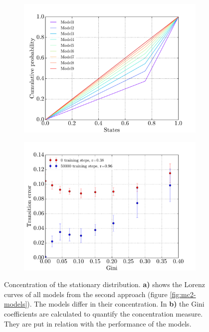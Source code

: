 \begin{figure}[!t]
    \centering
    \begin{subfigure}{0.48\textwidth}
    	\centering
        \includegraphics[width=\textwidth]{results/mc2_lorenz-curve}
        \caption{}
        \label{fig:mc2-lorenz}
    \end{subfigure}
    \hfill
    \begin{subfigure}{0.48\textwidth}
    	\centering
        \includegraphics[width=\textwidth]{results/mc2_correlation_inequality_gini_train}
        \caption{}
        \label{fig:mc2-gini}
    \end{subfigure}
    \caption[Concentration of the stationary distribution]{Concentration of the stationary distribution. \textbf{a)} shows the Lorenz curves of all models from the second approach (figure \ref{fig:mc2-models}). The models differ in their concentration. In \textbf{b)} the Gini coefficients are calculated to quantify the concentration measure. They are put in relation with the performance of the models.}
    \label{fig:mc2-concentration}
\end{figure}

